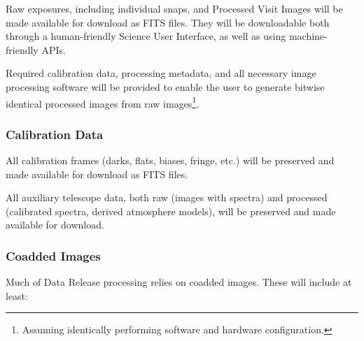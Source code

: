 
Raw exposures, including individual snaps, and Processed Visit Images will be made available for download as FITS files. They will be downloadable both through a human-friendly Science User Interface, as well as using machine-friendly APIs.

Required calibration data, processing metadata, and all necessary image processing software will be provided to enable the user to generate bitwise identical processed images from raw images\footnote{Assuming identically performing software and hardware configuration.}.

\subsubsection{Calibration Data}

All calibration frames (darks, flats, biases, fringe, etc.) will be preserved and made available for download as FITS files.

All auxiliary telescope data, both raw (images with spectra) and processed (calibrated spectra, derived atmosphere models), will be preserved and made available for download.

\subsubsection{Coadded Images}
\label{sec:coadds}

Much of Data Release processing relies on coadded images.  These will include at least:

